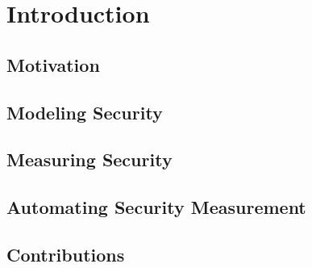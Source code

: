 \chapter{Introduction} \label{ch:intro}








\section{Motivation} \label{sec:intro:motivation}



\section{Modeling Security} \label{sec:intro:threat_modeling}



\section{Measuring Security} \label{sec:intro:sys_sec}



\section{Automating Security Measurement} \label{sec:intro:devsecops}



\section{Contributions}\label{sec:intro:contibutions}

